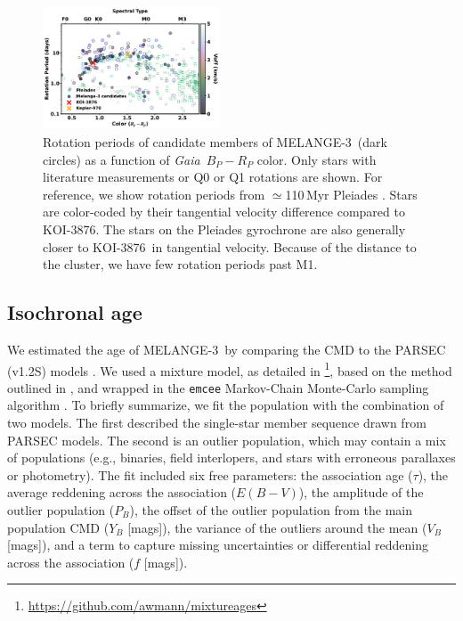 \documentclass[twocolumn, linenumbers]{aastex631}
\newcommand{\association}{MELANGE-3}
\newcommand{\starname}{KOI-3876}
\newcommand{\gaia}{\textit{Gaia}}
\begin{document}
\begin{figure}[tbhp]
    \centering
    \includegraphics[width=0.47\textwidth]{koi3876_cp-seq_final2.pdf}
    \caption{Rotation periods of candidate members of \association\ (dark circles) as a function of \gaia\ $B_P-R_P$ color. Only stars with literature measurements or Q0 or Q1 rotations are shown. For reference, we show rotation periods from $\simeq$110\,Myr Pleiades \citep[green squares;][]{Rebull2016}. Stars are color-coded by their tangential velocity difference compared to \starname. The stars on the Pleiades gyrochrone are also generally closer to \starname\ in tangential velocity. Because of the distance to the cluster, we have few rotation periods past M1. 
    \label{fig:rotation}
    }
\end{figure} 


\subsection{Isochronal age}\label{sec:isochrone}

We estimated the age of \association\ by comparing the CMD to the PARSEC (v1.2S) models \citep{PARSEC}. We used a mixture model, as detailed in \citet{THYMEVI}\footnote{\url{https://github.com/awmann/mixtureages}}, based on the method outlined in \citet{HoggRecipes}, and wrapped in the \texttt{emcee} Markov-Chain Monte-Carlo sampling algorithm \citep{Foreman-Mackey2013}. To briefly summarize, we fit the population with the combination of two models. The first described the single-star member sequence drawn from PARSEC models. The second is an outlier population, which may contain a mix of populations (e.g., binaries, field interlopers, and stars with erroneous parallaxes or photometry). The fit included six free parameters: the association age ($\tau$), the average reddening across the association ($E(B-V)$), the amplitude of the outlier population ($P_B$), the offset of the outlier population from the main population CMD ($Y_B$ [mags]), the variance of the outliers around the mean ($V_B$ [mags]), and a term to capture missing uncertainties or differential reddening across the association ($f$ [mags]). 
\end{document}
